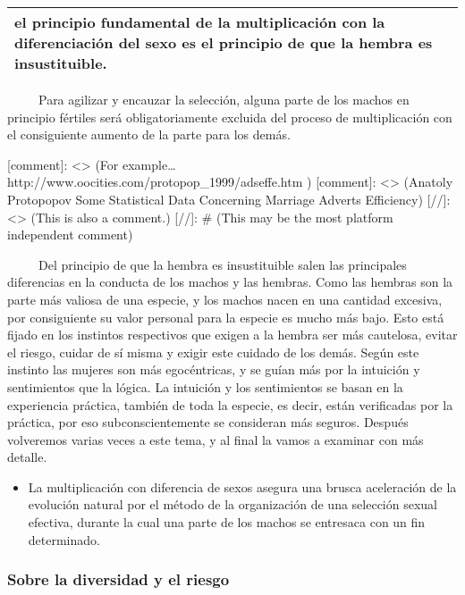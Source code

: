 \begin{longtable}[]{@{}l@{}}
\toprule
el principio fundamental de la multiplicación con la diferenciación del
sexo es el principio de que la hembra es insustituible.\tabularnewline
\bottomrule
\end{longtable}

~ ~ ~ Para agilizar y encauzar la selección, alguna parte de los machos
en principio fértiles será obligatoriamente excluida del proceso de
multiplicación con el consiguiente aumento de la parte para los demás.

{[}comment{]}: \textless{}\textgreater{} (For
example\ldots{}http://www.oocities.com/protopop\_1999/adseffe.htm )
{[}comment{]}: \textless{}\textgreater{} (Anatoly Protopopov \textbar{}
Some Statistical Data Concerning Marriage Adverts Efficiency) {[}//{]}:
\textless{}\textgreater{} (This is also a comment.) {[}//{]}: \# (This
may be the most platform independent comment)

~ ~ ~ Del principio de que la hembra es insustituible salen las
principales diferencias en la conducta de los machos y las hembras. Como
las hembras son la parte más valiosa de una especie, y los machos nacen
en una cantidad excesiva, por consiguiente su valor personal para la
especie es mucho más bajo. Esto está fijado en los instintos respectivos
que exigen a la hembra ser más cautelosa, evitar el riesgo, cuidar de sí
misma y exigir este cuidado de los demás. Según este instinto las
mujeres son más egocéntricas, y se guían más por la intuición y
sentimientos que la lógica. La intuición y los sentimientos se basan en
la experiencia práctica, también de toda la especie, es decir, están
verificadas por la práctica, por eso subconscientemente se consideran
más seguros. Después volveremos varias veces a este tema, y al final la
vamos a examinar con más detalle.

\begin{itemize}
\tightlist
\item
  La multiplicación con diferencia de sexos asegura una brusca
  aceleración de la evolución natural por el método de la organización
  de una selección sexual efectiva, durante la cual una parte de los
  machos se entresaca con un fin determinado.
\end{itemize}

\protect\hypertarget{M5}{}{}

\hypertarget{sobre-la-diversidad-y-el-riesgo}{\subsubsection{Sobre la
diversidad y el riesgo}\label{sobre-la-diversidad-y-el-riesgo}}

